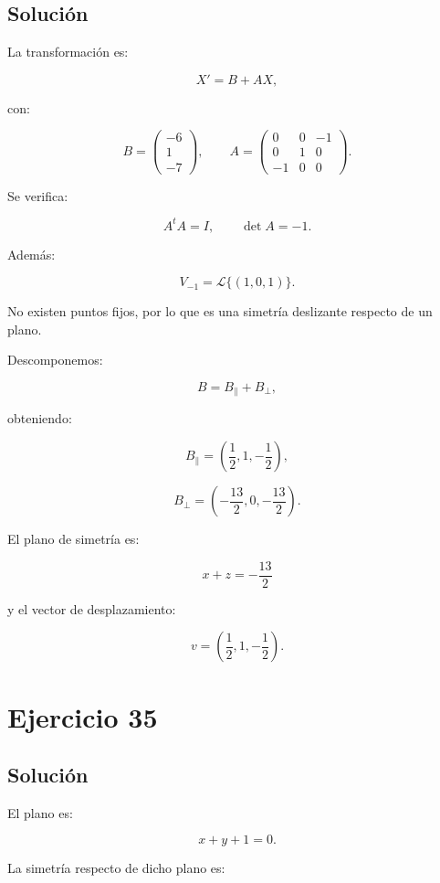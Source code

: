 \documentclass[11pt,a4paper]{article}
\begin{document}
\subsection{Solución}

La transformación es:

\[
X'=B+AX,
\]

con:

\[
B=
\begin{pmatrix}
-6\\
1\\
-7
\end{pmatrix},
\qquad
A=
\begin{pmatrix}
0&0&-1\\
0&1&0\\
-1&0&0
\end{pmatrix}.
\]

Se verifica:

\[
A^tA=I,
\qquad
\det A=-1.
\]

Además:

\[
V_{-1}
=
\mathcal L\{(1,0,1)\}.
\]

No existen puntos fijos, por lo que es una simetría deslizante respecto de un plano.

Descomponemos:

\[
B=B_\parallel+B_\perp,
\]

obteniendo:

\[
B_\parallel
=
\left(
\frac12,1,-\frac12
\right),
\]

\[
B_\perp
=
\left(
-\frac{13}{2},0,-\frac{13}{2}
\right).
\]

El plano de simetría es:

\[
\boxed{
x+z=-\frac{13}{2}
}
\]

y el vector de desplazamiento:

\[
\boxed{
v=
\left(
\frac12,1,-\frac12
\right).
}
\]

\section{Ejercicio 35}
\subsection{Solución}

El plano es:

\[
x+y+1=0.
\]

La simetría respecto de dicho plano es:
\end{document}
